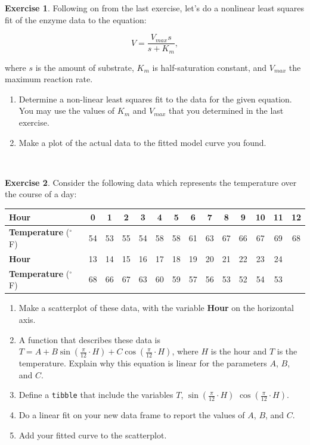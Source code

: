 \documentclass[
]{book}
\theoremstyle{definition}
\theoremstyle{definition}
\theoremstyle{definition}
\newtheorem{exercise}{Exercise}[chapter]
\theoremstyle{remark}
\begin{document}
\begin{exercise}
\protect\hypertarget{exr:unnamed-chunk-151}{}{\label{exr:unnamed-chunk-151} }Following on from the last exercise, let's do a nonlinear least squares fit of the enzyme data to the equation:

\begin{equation}
V = \frac{V_{max} s}{s+K_{m}},
\end{equation}

where \(s\) is the amount of substrate, \(K_{m}\) is half-saturation constant, and \(V_{max}\) the maximum reaction rate.

\begin{enumerate}[label=\alph*.]
\item Determine a non-linear least squares fit to the data for the given equation.  You may use the values of $K_{m}$ and $V_{max}$ that you determined in the last exercise.
\item Make a plot of the actual data to the fitted model curve you found.
\end{enumerate}
\end{exercise}

~

\begin{exercise}
\protect\hypertarget{exr:unnamed-chunk-152}{}{\label{exr:unnamed-chunk-152} }
Consider the following data which represents the temperature over the course of a day:

\begin{tabular}{lccccccccccccc}
\textbf{Hour} & 0 & 1 & 2 & 3 & 4 & 5 & 6 & 7 & 8 & 9 &10 &11 &12  \\ \hline
\textbf{Temperature} ($^{\circ}$F) 
& 54 &53 &55& 54& 58& 58 &61& 63 &67& 66& 67& 69& 68 \\ \hline \hline
\textbf{Hour} &13 &14 &15 &16 &17 &18 &19 &20& 21& 22& 23& 24 & \\
\textbf{Temperature} ($^{\circ}$F) &
 68& 66& 67& 63& 60& 59& 57& 56& 53& 52& 54& 53 & \\ \hline
\end{tabular}

\begin{enumerate}[label=\alph*.]
\item Make a scatterplot of these data, with the variable \textbf{Hour} on the horizontal axis.
\item A function that describes these data is $\displaystyle T = A + B \sin \left( \frac{\pi}{12} \cdot H \right) + C \cos \left( \frac{\pi}{12} \cdot H \right)$, where $H$ is the hour and $T$ is the temperature.  Explain why this equation is linear for the parameters $A$, $B$, and $C$.
\item Define a \texttt{tibble} that include the variables $T$, $\displaystyle \sin \left( \frac{\pi}{12} \cdot H \right)$ $\displaystyle \cos \left( \frac{\pi}{12} \cdot H \right)$.
\item Do a linear fit on your new data frame to report the values of $A$, $B$, and $C$.
\item Add your fitted curve to the scatterplot.
\end{enumerate}
\end{exercise}
\end{document}
